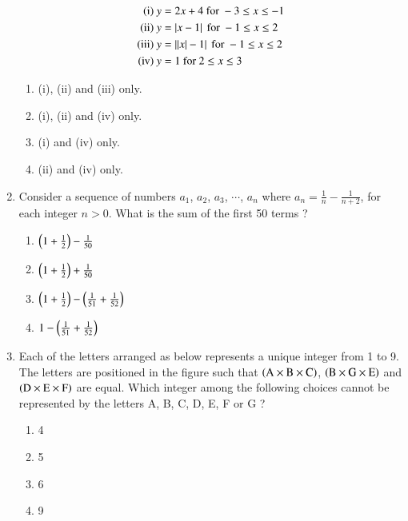 \documentclass[journal]{IEEEtran}
\begin{document}
\begin{enumerate}
\pagebreak
\begin{align*}
\text{(i)}\ y & = 2x + 4\ \text{for}\ -3 \leq x \leq -1 \\
\text{(ii)}\ y & = \left\vert x - 1\right\vert\ \text{for}\ -1 \leq x \leq 2 \\
\text{(iii)}\ y & = \left\vert\left\vert x\right\vert - 1\right\vert\ \text{for}\ -1 \leq x \leq 2 \\
\text{(iv)}\ y & = 1\ \text{for}\ 2 \leq x \leq 3 \\
\end{align*}
\begin{enumerate}
   \item (i), (ii) and (iii) only.
   \item (i), (ii) and (iv) only.
   \item (i) and (iv) only.
   \item (ii) and (iv) only. \\
\end{enumerate}
\item Consider a sequence of numbers $a_1$, $a_2$, $a_3$, $\cdots$, $a_n$ where $a_n = \frac{1}{n} - \frac{1}{n+2}$, for each integer $n > 0$. What is the sum of the first 50 terms ?
\begin{enumerate}
    \item $\left(1 + \frac{1}{2}\right) - \frac{1}{50}$
    \item $\left(1 + \frac{1}{2}\right) + \frac{1}{50}$
    \item $\left(1 + \frac{1}{2}\right) - \left(\frac{1}{51} + \frac{1}{52}\right)$
    \item $1 - \left(\frac{1}{51} + \frac{1}{52}\right)$ \\
\end{enumerate}
\item Each of the letters arranged as below represents a unique integer from 1 to 9. The letters are positioned in the figure such that $\left(\text{A} \times \text{B} \times \text{C}\right)$, $\left(\text{B} \times \text{G} \times \text{E}\right)$ and $\left(\text{D} \times \text{E} \times \text{F}\right)$ are equal. Which integer among the following choices cannot be represented by the letters A, B, C, D, E, F or G ?
\begin{figure}[!ht]
\centering
\resizebox{0.3\textwidth}{!}{%

}%
\end{figure}
\pagebreak
\begin{enumerate}
    \item 4
    \item 5
    \item 6
    \item 9 \\

\end{enumerate}
\end{enumerate}
\end{document}

